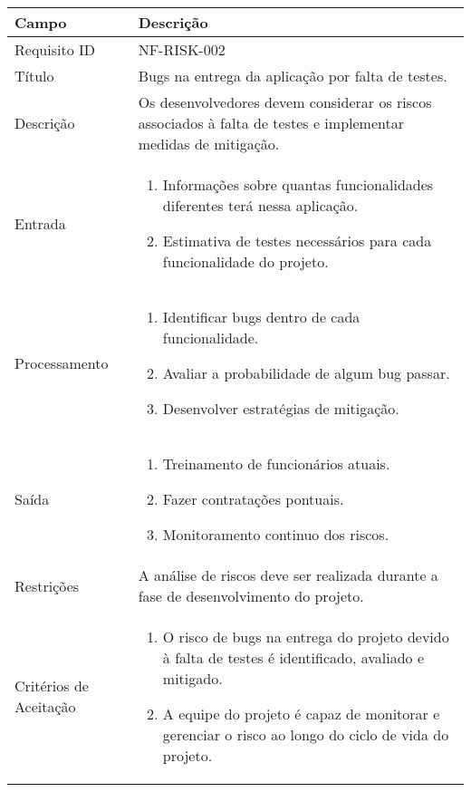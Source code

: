\begin{table}[htbp]
    \begin{tabularx}{\textwidth}{| l | X |}
    \hline
    Campo             & Descrição                                                                                                                                                                           \\ \hline
    Requisito ID    & NF-RISK-002                                                                                                                                                                              \\ \hline
    Título              & Bugs na entrega da aplicação por falta de testes.\\ \hline
    Descrição         &  Os desenvolvedores devem considerar os riscos associados à falta de testes e implementar medidas de mitigação.\\ \hline
    Entrada &
    \begin{enumerate}
        \item Informações sobre quantas funcionalidades diferentes terá nessa aplicação.
        \item Estimativa de testes necessários para cada funcionalidade do projeto.
        
    \end{enumerate}
    
    \\ \hline
    Processamento & 
    \begin{enumerate}
        \item Identificar bugs dentro de cada funcionalidade.
        \item Avaliar a probabilidade de algum bug passar.
        \item Desenvolver estratégias de mitigação.
    \end{enumerate}
    
    \\ \hline
    Saída & 
    \begin{enumerate}
        \item Treinamento de funcionários atuais.
        \item Fazer contratações pontuais.
        \item Monitoramento continuo dos riscos.
    \end{enumerate}
    
    \\ \hline
    Restrições & A análise de riscos deve ser realizada durante a fase de desenvolvimento do projeto.\\ \hline
    Critérios de Aceitação &
    \begin{enumerate}
        \item  O risco de bugs na entrega do projeto devido à falta de testes é identificado, avaliado e mitigado.
        \item A equipe do projeto é capaz de monitorar e gerenciar o risco ao longo do ciclo de vida do projeto. 
    \end{enumerate}
    

\end{tabularx}
\end{table}
